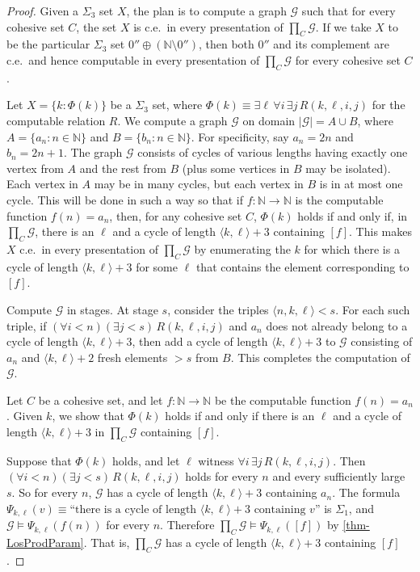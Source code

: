 \documentclass[11pt,a4paper,reqno]{amsart}
\theoremstyle{definition}
\newcommand{\la}{\langle}
\newcommand{\ra}{\rangle}
\newcommand{\Nb}{\mathbb{N}}
\newcommand{\mc}[1]{\mathcal{#1}}
\begin{document}
\begin{proof}
Given a $\Sigma_3$ set $X$, the plan is to compute a graph $\mc{G}$ such that for every cohesive set $C$, the set $X$ is c.e.\ in every presentation of $\prod_C \mc{G}$.  If we take $X$ to be the particular $\Sigma_3$ set $0'' \oplus (\Nb \setminus 0'')$, then both $0''$ and its complement are c.e.\ and hence computable in every presentation of $\prod_C \mc{G}$ for every cohesive set $C$.

Let $X = \{k : \Phi(k)\}$ be a $\Sigma_3$ set, where $\Phi(k) \equiv \exists \ell\, \forall i\, \exists j\, R(k,\ell,i,j)$ for the computable relation $R$.  We compute a graph $\mc{G}$ on domain $|\mc{G}| = A \cup B$, where $A = \{a_n : n \in \Nb\}$ and $B = \{b_n : n \in \Nb\}$.  For specificity, say $a_n = 2n$ and $b_n = 2n+1$.  The graph $\mc{G}$ consists of cycles of various lengths having exactly one vertex from $A$ and the rest from $B$ (plus some vertices in $B$ may be isolated).  Each vertex in $A$ may be in many cycles, but each vertex in $B$ is in at most one cycle.  This will be done in such a way so that if $f \colon \Nb \to \Nb$ is the computable function $f(n) = a_n$, then, for any cohesive set $C$, $\Phi(k)$ holds if and only if, in $\prod_C \mc{G}$, there is an $\ell$ and a cycle of length $\la k, \ell \ra + 3$ containing $[f]$.  This makes $X$ c.e.\ in every presentation of $\prod_C \mc{G}$ by enumerating the $k$ for which there is a cycle of length $\la k, \ell \ra + 3$ for some $\ell$ that contains the element corresponding to $[f]$.

Compute $\mc{G}$ in stages.  At stage $s$, consider the triples $\la n, k, \ell \ra < s$.  For each such triple, if $(\forall i < n)(\exists j < s)\, R(k,\ell,i,j)$ and $a_n$ does not already belong to a cycle of length $\la k, \ell \ra + 3$, then add a cycle of length $\la k, \ell \ra + 3$ to $\mc{G}$ consisting of $a_n$ and $\la k, \ell \ra + 2$ fresh elements $>\! s$ from $B$.  This completes the computation of $\mc{G}$.

Let $C$ be a cohesive set, and let $f \colon \Nb \to \Nb$ be the computable function $f(n) = a_n$.  Given $k$, we show that $\Phi(k)$ holds if and only if there is an $\ell$ and a cycle of length $\la k, \ell \ra + 3$ in $\prod_C \mc{G}$ containing $[f]$.

Suppose that $\Phi(k)$ holds, and let $\ell$ witness $\forall i\, \exists j\, R(k,\ell,i,j)$.  Then $(\forall i < n)(\exists j < s)\, R(k,\ell,i,j)$ holds for every $n$ and every sufficiently large $s$.  So for every $n$, $\mc{G}$ has a cycle of length $\la k, \ell \ra + 3$ containing $a_n$.  The formula $\Psi_{k,\ell}(v) \equiv \text{``there is a cycle of length $\la k, \ell \ra + 3$ containing $v$''}$ is $\Sigma_1$, and $\mc{G} \models \Psi_{k,\ell}(f(n))$ for every $n$.  Therefore $\prod_C \mc{G} \models \Psi_{k,\ell}([f])$ by \cref{thm-LosProdParam}.  That is, $\prod_C \mc{G}$ has a cycle of length $\la k, \ell \ra + 3$ containing $[f]$.


\end{proof}
\end{document}
